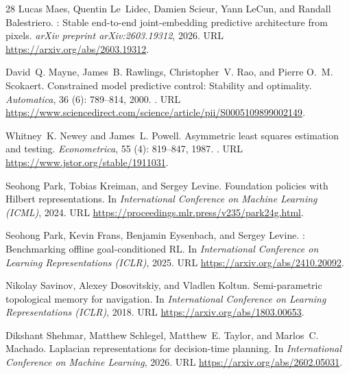 \documentclass{article}
\theoremstyle{definition}
\theoremstyle{remark}
\begin{document}
\begin{thebibliography}{28}
Lucas Maes, Quentin Le~Lidec, Damien Scieur, Yann LeCun, and Randall
  Balestriero.
: Stable end-to-end joint-embedding predictive
  architecture from pixels.
\newblock \emph{arXiv preprint arXiv:2603.19312}, 2026.
\newblock URL \url{https://arxiv.org/abs/2603.19312}.

David~Q. Mayne, James~B. Rawlings, Christopher~V. Rao, and Pierre O.~M.
  Scokaert.
\newblock Constrained model predictive control: Stability and optimality.
\newblock \emph{Automatica}, 36 (6): 789--814, 2000.
\newblock {}.
\newblock URL
  \url{https://www.sciencedirect.com/science/article/pii/S0005109899002149}.

Whitney~K. Newey and James~L. Powell.
\newblock Asymmetric least squares estimation and testing.
\newblock \emph{Econometrica}, 55 (4): 819--847, 1987.
\newblock {}.
\newblock URL \url{https://www.jstor.org/stable/1911031}.

Seohong Park, Tobias Kreiman, and Sergey Levine.
\newblock Foundation policies with {Hilbert} representations.
\newblock In \emph{International Conference on Machine Learning (ICML)}, 2024.
\newblock URL \url{https://proceedings.mlr.press/v235/park24g.html}.

Seohong Park, Kevin Frans, Benjamin Eysenbach, and Sergey Levine.
: Benchmarking offline goal-conditioned {RL}.
\newblock In \emph{International Conference on Learning Representations
  (ICLR)}, 2025.
\newblock URL \url{https://arxiv.org/abs/2410.20092}.

Nikolay Savinov, Alexey Dosovitskiy, and Vladlen Koltun.
\newblock Semi-parametric topological memory for navigation.
\newblock In \emph{International Conference on Learning Representations
  (ICLR)}, 2018.
\newblock URL \url{https://arxiv.org/abs/1803.00653}.

Dikshant Shehmar, Matthew Schlegel, Matthew~E. Taylor, and Marlos~C. Machado.
\newblock Laplacian representations for decision-time planning.
\newblock In \emph{International Conference on Machine Learning}, 2026.
\newblock URL \url{https://arxiv.org/abs/2602.05031}.


\end{thebibliography}
\end{document}
